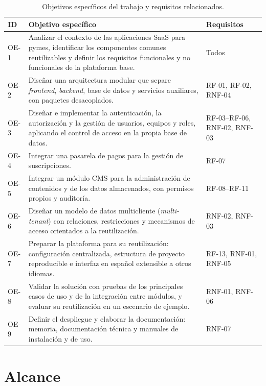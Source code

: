 \begin{table}[htbp]
  \centering
  \small
  \caption{Objetivos específicos del trabajo y requisitos relacionados.}
  \label{tab:intro-objetivos}
  \begin{tabularx}{\textwidth}{@{}lXl@{}}
    \toprule
    \textbf{ID} & \textbf{Objetivo específico} & \textbf{Requisitos} \\
    \midrule
    OE-1 & Analizar el contexto de las aplicaciones SaaS para pymes, identificar los componentes comunes reutilizables y definir los requisitos funcionales y no funcionales de la plataforma base. & Todos \\
    OE-2 & Diseñar una arquitectura modular que separe \textit{frontend}, \textit{backend}, base de datos y servicios auxiliares, con paquetes desacoplados. & RF-01, RF-02, RNF-04 \\
    OE-3 & Diseñar e implementar la autenticación, la autorización y la gestión de usuarios, equipos y roles, aplicando el control de acceso en la propia base de datos. & RF-03--RF-06, RNF-02, RNF-03 \\
    OE-4 & Integrar una pasarela de pagos para la gestión de suscripciones. & RF-07 \\
    OE-5 & Integrar un módulo CMS para la administración de contenidos y de los datos almacenados, con permisos propios y auditoría. & RF-08--RF-11 \\
    OE-6 & Diseñar un modelo de datos multicliente (\textit{multi-tenant}) con relaciones, restricciones y mecanismos de acceso orientados a la reutilización. & RNF-02, RNF-03 \\
    OE-7 & Preparar la plataforma para su reutilización: configuración centralizada, estructura de proyecto reproducible e interfaz en español extensible a otros idiomas. & RF-13, RNF-01, RNF-05 \\
    OE-8 & Validar la solución con pruebas de los principales casos de uso y de la integración entre módulos, y evaluar su reutilización en un escenario de ejemplo. & RNF-01, RNF-06 \\
    OE-9 & Definir el despliegue y elaborar la documentación: memoria, documentación técnica y manuales de instalación y de uso. & RNF-07 \\
    \bottomrule
  \end{tabularx}
\end{table}

\section{Alcance}
\label{sec:intro-alcance}

